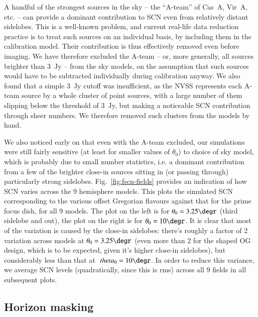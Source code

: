 \documentclass{aa}
\begin{document}
A handful of the strongest sources in the sky -- the ``A-team'' of  Cas~A, Vir~A, etc. -- can provide a dominant contribution to SCN even from relatively distant sidelobes. This is a well-known problem, and current real-life data reduction practice is to treat such sources on an individual basis, by including them in the calibration model. Their contribution is thus effectively removed even before imaging. We have therefore excluded the A-team -- or, more generally, all sources brighter than 3~Jy -- from the sky models, on the assumption that such sources would have to be subtracted individually during calibration anyway. We also found that a simple 3~Jy cutoff was insufficient, as the NVSS represents each A-team source by a whole cluster of point sources, with a large number of them slipping below the threshold of 3~Jy, but making a noticeable SCN contribution through sheer numbers. We therefore removed such clusters from the models by hand.

We also noticed early on that even with the A-team excluded, our simulations were still fairly sensitive (at least for smaller values of $\theta_0$) to choice of sky model, which is probably due to small number statistics, i.e. a dominant contribution from a few of the brighter close-in sources sitting in (or passing through) particularly strong sidelobes. Fig.~\ref{fig:fscn-fields} provides an indication of how SCN varies across the 9 hemisphere models. This plots the simulated SCN corresponding to the various offset Gregorian flavours against that for the prime focus dish, for all 9 models. The plot on the left is for $\theta_0=3.25\degr$ (third sidelobe and out), the plot on the right is for $\theta_0=10\degr$. It is clear that most of the variation is caused by the close-in sidelobes: there's roughly a factor of 2 variation across models at $\theta_0=3.25\degr$ (even more than 2 for the shaped OG design, which is to be expected, given it's higher close-in sidelobes), but considerably less than that at $\
theta_0=10\degr$. In 
order to reduce this variance, we average SCN levels (quadratically, since this is rms) across all 9 fields in all subsequent plots.

\subsection{Horizon masking}
\label{sec:horizon-masking}
\end{document}

